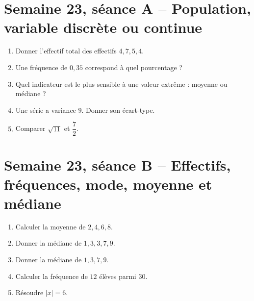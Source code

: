 \section{Semaine 23, séance A -- Population, variable discrète ou continue}
\begin{enumerate}
  \item Donner l'effectif total des effectifs $4,7,5,4$.
  \item Une fréquence de $0{,}35$ correspond à quel pourcentage ?
  \item Quel indicateur est le plus sensible à une valeur extrême : moyenne ou médiane ?
  \item Une série a variance $9$. Donner son écart-type.
  \item Comparer $\sqrt{11}$ et $\dfrac72$.
\end{enumerate}

\section{Semaine 23, séance B -- Effectifs, fréquences, mode, moyenne et médiane}
\begin{enumerate}
  \item Calculer la moyenne de $2,4,6,8$.
  \item Donner la médiane de $1,3,3,7,9$.
  \item Donner la médiane de $1,3,7,9$.
  \item Calculer la fréquence de $12$ élèves parmi $30$.
  \item Résoudre $|x|=6$.
\end{enumerate}

